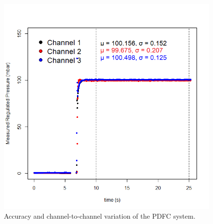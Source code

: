 \begin{figure}[H]
\centering 
\includegraphics[width=01.0\columnwidth]{constV.PNG} 
\caption[PDFC accuracy and inter-channel variation]{Accuracy and channel-to-channel variation of the PDFC system.} 
\label{fig:constV} 
\end{figure}
